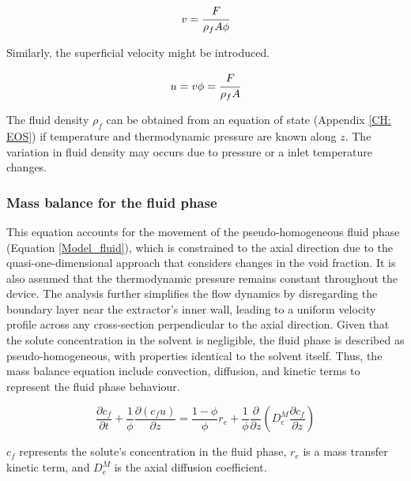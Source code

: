 \documentclass[../Article_Model_Parameters.tex]{subfiles}
\begin{document}
	{\footnotesize
	\begin{equation}
		v = \cfrac{F}{\rho_f A\phi} 
	\end{equation}
	}
	
	Similarly, the superficial velocity might be introduced.
	
	{\footnotesize
		\begin{equation}
			u = v \phi = \cfrac{F}{\rho_f A }
		\end{equation}
	}
	
	The fluid density $\rho_f$ can be obtained from an equation of state (Appendix \ref{CH: EOS}) if temperature and thermodynamic pressure are known along $z$. The variation in fluid density may occurs due to pressure or a inlet temperature changes. 
		
	\subsubsection{Mass balance for the fluid phase} \label{CH: Mass_balance_fluid}
	
	This equation accounts for the movement of the pseudo-homogeneous fluid phase (Equation \ref{Model_fluid}), which is constrained to the axial direction due to the quasi-one-dimensional approach that considers changes in the void fraction. It is also assumed that the thermodynamic pressure remains constant throughout the device. The analysis further simplifies the flow dynamics by disregarding the boundary layer near the extractor's inner wall, leading to a uniform velocity profile across any cross-section perpendicular to the axial direction. Given that the solute concentration in the solvent is negligible, the fluid phase is described as pseudo-homogeneous, with properties identical to the solvent itself. Thus, the mass balance equation include convection, diffusion, and kinetic terms to represent the fluid phase behaviour.
	
	{\footnotesize
		\begin{equation}
			\label{Model_fluid}
			\frac{\partial c_f}{\partial t}
			+ \frac{1}{\phi} \frac{\partial \left( c_f u\right)}{\partial z}
			= \frac{1-\phi}{\phi} r_e
			+ \frac{1}{\phi} \frac{\partial}{\partial z} \left( D^M_e \frac{\partial c_f}{\partial z} \right)
		\end{equation}
	}
	
	$c_f$ represents the solute's concentration in the fluid phase, $r_e$ is a mass transfer kinetic term, and $D^M_e$ is the axial diffusion coefficient.
	
\end{document}

